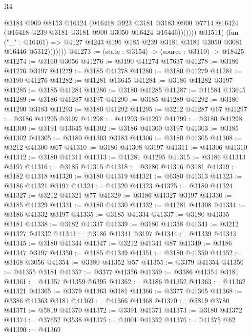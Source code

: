 \begin{lexlean}{R4}
\begin{coremodule}
                            @3184
                            @900
                            @8153
                            @16424
                            (@16418
                              @923
                              @3181
                              @3183
                              @900
                              @7714
                              @16424
                              (@16418 @239 @3181 @3181 @900 @3050 @16424 @16446)))))))
                  @31511)
                (fun ("_" : @16461) =>
                @4127 @4243 @196 @185 @239 @3181 @3181 @3050 @3081 @16446 @5312)))))))
@41273 := (state : @3154) -> (source : @3110) -> @18425
@41274 := @3160 @3056
@41276 := @3190 @41274 @17637
@41278 := @3186 @41276 @3197
@41279 := @3185 @41278
@41280 := @3180 @41279
@41281 := @3190 @41276
@41282 := @41281 @13645
@41284 := @3186 @41282 @3197
@41285 := @3185 @41284
@41286 := @3180 @41285
@41287 := @11584 @13645
@41289 := @3186 @41287 @3197
@41290 := @3185 @41289
@41292 := @3180 @41290 @3183
@41293 := @3180 @41292
@41295 := @3212 @41287 @67
@41297 := @3186 @41295 @3197
@41298 := @41293 @41297
@41299 := @3180 @41298
@41300 := @3191 @13645
@41302 := @3186 @41300 @3197
@41303 := @3185 @41302
@41305 := @3180 @41303 @3183
@41306 := @3180 @41305
@41308 := @3212 @41300 @67
@41310 := @3186 @41308 @3197
@41311 := @41306 @41310
@41312 := @3180 @41311
@41313 := @41281 @41295
@41315 := @3186 @41313 @3197
@41316 := @3185 @41315
@41318 := @3180 @41316 @3181
@41319 := @3182 @41318
@41320 := @3180 @41319
@41321 := @6380 @41313
@41323 := @3186 @41321 @3197
@41324 := @41320 @41323
@41325 := @3180 @41324
@41327 := @3212 @41321 @77
@41329 := @3186 @41327 @3197
@41330 := @3185 @41329
@41331 := @3180 @41330
@41332 := @41281 @41308
@41334 := @3186 @41332 @3197
@41335 := @3185 @41334
@41337 := @3180 @41335 @3181
@41338 := @3182 @41337
@41339 := @3180 @41338
@41341 := @3212 @41327 @41332
@41343 := @3186 @41341 @3197
@41344 := @41339 @41343
@41345 := @3180 @41344
@41347 := @3212 @41341 @87
@41349 := @3186 @41347 @3197
@41350 := @3185 @41349
@41351 := @3180 @41350
@41352 := @3168 @3056
@41354 := @3380 @41352 @57
@41355 := @3379 @41354
@41356 := @41355 @3181
@41357 := @3377 @41356
@41359 := @3386 @41354 @3181
@41361 := @41357 @41359 @6395
@41362 := @3186 @41352
@41363 := @41362 @41321
@41365 := @3379 @41363 @3181
@41366 := @3377 @41365
@41368 := @3386 @41363 @3181
@41369 := @41366 @41368
@41370 := @5819 @3780
@41371 := @5819 @41370
@41372 := @3391 @41371
@41373 := @3180 @41372
@41374 := @37652 @3538
@41375 := @4001 @41352
@41376 := @41375 @62
@41390 := @41369

\end{coremodule}
\end{lexlean}
